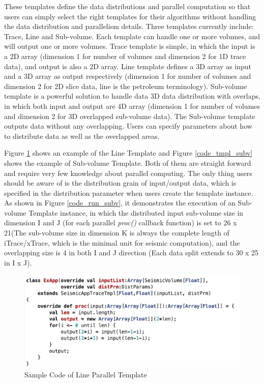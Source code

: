 These templates define the data distributions and parallel computation so that users can simply select the right templates for their algorithms without handling the data distribution and parallelism details. Three templates currently include: Trace, Line and Sub-volume. Each template can handle one or more volumes, and will output one or more volumes. Trace template is simple, in which the input is a 2D array (dimension 1 for number of volumes and dimension 2 for 1D trace data), and output is also a 2D array. Line template defines a 3D array as input and a 3D array as output respectively (dimension 1 for number of volumes and dimension 2 for 2D slice data, line is the petroleum terminology). Sub-volume template is a powerful solution to handle data 3D data distribution with overlaps, in which both input and output are 4D array (dimension 1 for number of volumes and dimension 2 for 3D overlapped sub-volume data). The Sub-volume template outputs data without any overlapping. Users can specify parameters about how to distribute data as well as the overlapped areas. 

Figure \ref{code_tmpl_line} shows an example of the Line Template and Figure \ref{code_tmpl_subv} shows the example of Sub-volume Template. Both of them are straight forward and require very few knowledge about parallel computing. The only thing users should be aware of is the distribution grain of input/output data, which is specified in the distribution parameter when users create the template instance. As shown in Figure \ref{code_run_subv}, it demonstrates the execution of an Sub-volume Template instance, in which the distributed input sub-volume size in dimension I and J (for each parallel \emph{proc()} callback function) is set to 26 x 21(The sub-volume size in dimension K is always the complete length of iTrace/xTrace, which is the minimal unit for seismic computation), and the overlapping size is 4 in both I and J direction (Each data split extends to 30 x 25 in I x J). 

\begin{figure}[h]
\centering
\includegraphics[scale=0.55]{figures/code_tmpl_line.png}
\caption{Sample Code of Line Parallel Template}
\label{code_tmpl_line}
\end{figure}

